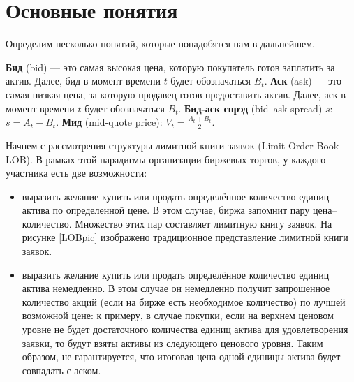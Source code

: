 
\section{Основные понятия}
Определим несколько понятий, которые понадобятся нам в дальнейшем.
\begin{definition}
    \textbf{Бид} (bid) --- это самая высокая цена, которую покупатель готов заплатить за актив. 
    Далее, бид в момент времени $t$ будет обозначаться $B_t$.
    \textbf{Аск} (ask) --- это самая низкая цена, за которую продавец готов предоставить актив. 
    Далее, аск в момент времени $t$ будет обозначаться $B_t$.
    \textbf{Бид-аск спрэд} (bid–ask spread) $s$: $s = A_t - B_t$.
    \textbf{Мид} (mid-quote price): $V_{t} = \frac{A_{t} + B_{t}}{2}$.
\end{definition}
Начнем с рассмотрения структуры лимитной книги заявок (Limit Order Book -- LOB). 
В рамках этой парадигмы организации биржевых торгов, у каждого участника есть две возможности:
\begin{itemize}
    \item выразить желание купить или продать определённое количество единиц актива по определенной цене. 
    В этом случае, биржа запомнит пару цена--количество. Множество этих пар составляет 
    лимитную книгу заявок. На рисунке \ref{LOBpic} изображено традиционное представление лимитной
    книги заявок.
    \item выразить желание купить или продать определённое количество единиц актива немедленно. 
    В этом случае он немедленно получит запрошенное количество акций (если на бирже есть необходимое количество)
    по лучшей возможной цене: к примеру, в случае покупки, если на верхнем ценовом уровне не будет достаточного
    количества единиц актива для удовлетворения заявки, то будут взяты активы из следующего ценового уровня.
    Таким образом, не гарантируется, что итоговая цена одной единицы актива будет совпадать с аском.
    
\end{itemize}

